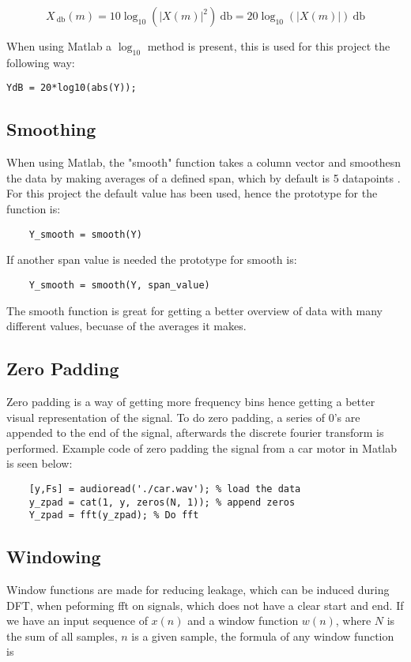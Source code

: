 \begin{equation}
X_{\SI{}{\decibel}}(m) = 10\log_{10}(|X(m)|^2)\SI{}{\decibel} = 20\log_{10}(|X(m)|)\SI{}{\decibel}
\end{equation}

When using Matlab a $\log_{10}$ method is present, this is used for this project the following way:

\begin{verbatim}
YdB = 20*log10(abs(Y));
\end{verbatim}

\subsection{Smoothing}

When using Matlab, the "smooth" function takes a column vector and smoothesn the data by making averages of a defined span, which by default is 5 datapoints \cite[smooth]{MATLAB_DOC}. 
For this project the default value has been used, hence the prototype for the function is:

\begin{verbatim}
	Y_smooth = smooth(Y)
\end{verbatim}
If another span value is needed the prototype for smooth is:

\begin{verbatim}
	Y_smooth = smooth(Y, span_value)
\end{verbatim}

The smooth function is great for getting a better overview of data with many different values, becuase of the averages it makes. 

\subsection{Zero Padding}
Zero padding is a way of getting more frequency bins hence getting a better visual representation of the signal. 
To do zero padding, a series of 0's are appended to the end of the signal, afterwards the discrete fourier transform is performed. 
Example code of zero padding the signal from a car motor in Matlab is seen below:

\begin{verbatim}
	[y,Fs] = audioread('./car.wav'); % load the data
	y_zpad = cat(1, y, zeros(N, 1)); % append zeros
	Y_zpad = fft(y_zpad); % Do fft
\end{verbatim}

\subsection{Windowing}
\label{sec:windowing}
Window functions are made for reducing leakage, which can be induced during DFT, when peforming fft on signals, which does not have a clear start and end. If we have an input sequence of $x(n)$ and a window function $w(n)$, where $N$ is the sum of all samples, $n$ is a given sample, the formula of any window function is

